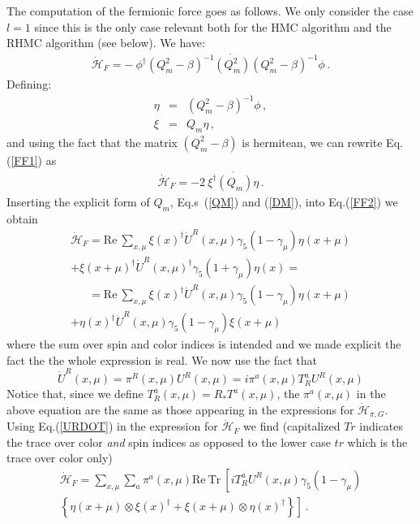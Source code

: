 \documentclass{article}[12pt]
\begin{document}
The computation of the fermionic force goes as follows. We only consider the case $l=1$ since this is the
only case relevant both for the HMC algorithm and the RHMC algorithm (see below). We have:
\begin{eqnarray}
\dot{\mathcal{H}}_F = -\ \phi^\dagger (Q_m^2 - \beta)^{-1} \dot{(Q_m^2)} (Q_m^2 - \beta)^{-1} \phi \, . \label{FF1}
\end{eqnarray}
Defining:
\begin{eqnarray}
\eta &=& (Q_m^2 - \beta)^{-1} \phi \, , \label{HMCETA}\\
\xi &=& Q_m \eta \, ,
\end{eqnarray}
and using the fact that the matrix $(Q_m^2-\beta)$ is hermitean, we can rewrite Eq.(\ref{FF1}) as
\begin{eqnarray}
\dot{\mathcal{H}}_F = - 2 \ \xi^\dagger \dot{(Q_m)} \eta \, . \label{FF2}
\end{eqnarray}
Inserting the explicit form of $Q_m$, Eq.s~(\ref{QM}) and (\ref{DM}), into Eq.(\ref{FF2}) we obtain
\begin{multline}
\dot{\mathcal{H}}_F = \mathrm{Re\ }\sum_{x,\mu} \xi(x)^\dagger \dot U^R(x,\mu) \gamma_5 (1-\gamma_\mu) \eta(x+\mu) \\ 
+ \xi(x+\mu)^\dagger \dot U^R(x,\mu)^\dagger \gamma_5 (1+\gamma_\mu) \eta(x) = \nonumber 
\end{multline}
\begin{multline}
\phantom{\dot{\mathcal{H}}_F} = \mathrm{Re\ }\sum_{x,\mu} \xi(x)^\dagger \dot U^R(x,\mu) \gamma_5 (1-\gamma_\mu) \eta(x+\mu) \\ 
+ \eta(x)^\dagger \dot U^R(x,\mu) \gamma_5 (1-\gamma_\mu) \xi(x+\mu)
\end{multline}
where the sum over spin and color indices is intended and we made explicit the fact the the whole 
expression is real.
We now use the fact that 
\begin{equation}
\dot U^R (x,\mu) = \pi^R(x,\mu) U^R(x,\mu) = i \pi^a(x,\mu) T^a_R U^R(x,\mu) \label{URDOT}
\end{equation}
Notice that, since we define $T^a_R(x,\mu) = R_* T^a(x,\mu)$, the $\pi^a(x,\mu)$ in the above 
equation are the same as those appearing in the expressions for $\dot{\mathcal{H}}_{\pi,G}$.
Using Eq.(\ref{URDOT}) in the expression for $\dot{\mathcal{H}}_{F}$ we find
(capitalized $Tr$ indicates the trace over color \textit{and} spin indices as opposed to the lower
 case $tr$ which is the trace over color only)
\begin{multline}
\dot{\mathcal{H}}_F = \sum_{x,\mu} \sum_a \pi^a(x,\mu) \mathrm{Re\ Tr\ } \left[ iT^a_R U^R(x,\mu) \gamma_5 (1-\gamma_\mu) \right. \\
		\left. \left\{ \eta(x+\mu)\otimes\xi(x)^\dagger + \xi(x+\mu)\otimes\eta(x)^\dagger \right\} \right] \, . \label{HDOTF}
\end{multline}
\end{document}
